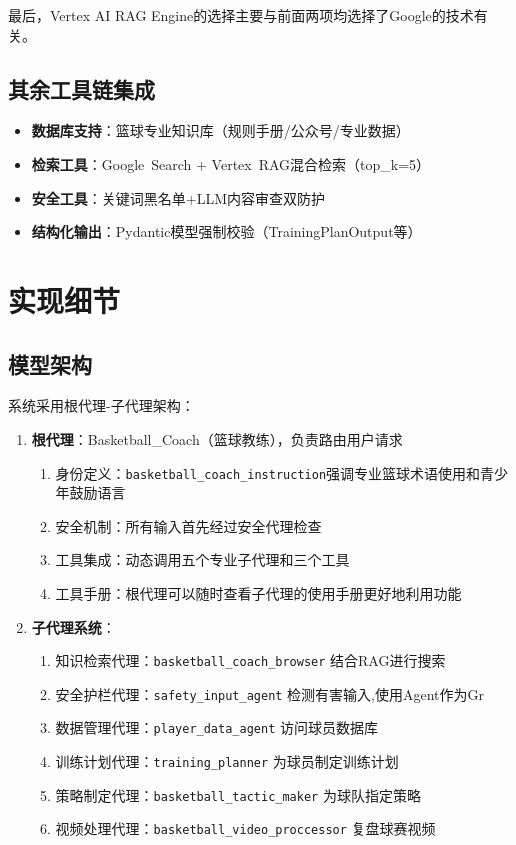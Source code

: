 \documentclass{article}
\theoremstyle{plain}
\theoremstyle{definition}
\theoremstyle{remark}
\begin{document}
最后，Vertex AI RAG Engine的选择主要与前面两项均选择了Google的技术有关。

\subsection{其余工具链集成}
\begin{itemize}
    \item \textbf{数据库支持}：篮球专业知识库（规则手册/公众号/专业数据）
    \item \textbf{检索工具}：Google\ Search + Vertex\ RAG混合检索（top\_k=5）
    \item \textbf{安全工具}：关键词黑名单+LLM内容审查双防护
    \item \textbf{结构化输出}：Pydantic模型强制校验（TrainingPlanOutput等）
\end{itemize}

\section{实现细节}

\subsection{模型架构}
系统采用根代理-子代理架构：
\begin{enumerate}
    \item \textbf{根代理}：Basketball\_Coach（篮球教练），负责路由用户请求
    \begin{enumerate}
        \item 身份定义：\texttt{basketball\_coach\_instruction}强调专业篮球术语使用和青少年鼓励语言
        \item 安全机制：所有输入首先经过安全代理检查
        \item 工具集成：动态调用五个专业子代理和三个工具
        \item 工具手册：根代理可以随时查看子代理的使用手册更好地利用功能
    \end{enumerate}
    
    \item \textbf{子代理系统}：
    \begin{enumerate}
        \item 知识检索代理：\texttt{basketball\_coach\_browser} 结合RAG进行搜索
        \item 安全护栏代理：\texttt{safety\_input\_agent} 检测有害输入,使用Agent作为Gr
        \item 数据管理代理：\texttt{player\_data\_agent} 访问球员数据库
        \item 训练计划代理：\texttt{training\_planner} 为球员制定训练计划
        \item 策略制定代理：\texttt{basketball\_tactic\_maker} 为球队指定策略
        \item 视频处理代理：\texttt{basketball\_video\_proccessor} 复盘球赛视频
    \end{enumerate}
\end{enumerate}
\end{document}
